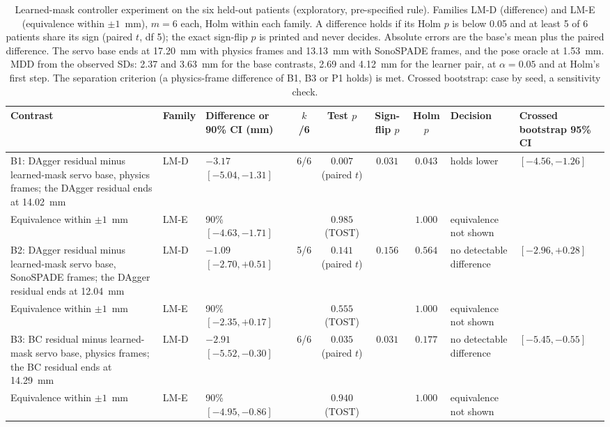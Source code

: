 
\begin{table}[tp]
\renewcommand{\baselinestretch}{1}\scriptsize
\caption{Learned-mask controller experiment on the six held-out patients (exploratory, pre-specified rule). Families LM-D (difference) and LM-E (equivalence within $\pm 1$~mm), $m = 6$ each, Holm within each family. A difference holds if its Holm $p$ is below 0.05 and at least 5 of 6 patients share its sign (paired $t$, df 5); the exact sign-flip $p$ is printed and never decides. Absolute errors are the base's mean plus the paired difference. The servo base ends at 17.20~mm with physics frames and 13.13~mm with SonoSPADE frames, and the pose oracle at 1.53~mm. MDD from the observed SDs: 2.37 and 3.63~mm for the base contrasts, 2.69 and 4.12~mm for the learner pair, at $\alpha = 0.05$ and at Holm's first step. The separation criterion (a physics-frame difference of B1, B3 or P1 holds) is met. Crossed bootstrap: case by seed, a sensitivity check.}
\label{tab:arm-a}
\centering
\setlength{\tabcolsep}{3pt}
\begin{tabularx}{\textwidth}{@{}>{\raggedright\arraybackslash}X l l c c c c >{\raggedright\arraybackslash}p{} l@{}}
\toprule
Contrast & Family & Difference or 90\% CI (mm) & $k$/6 & Test $p$ & Sign-flip $p$ & Holm $p$ & Decision & Crossed bootstrap 95\% CI \\
\midrule
\quad B1: DAgger residual minus learned-mask servo base, physics frames; the DAgger residual ends at 14.02~mm & LM-D & $-3.17$ $[-5.04, -1.31]$ & 6/6 & $0.007$ (paired $t$) & $0.031$ & $0.043$ & holds lower & $[-4.56, -1.26]$ \\
\quad\quad Equivalence within $\pm 1$~mm & LM-E & 90\% $[-4.63, -1.71]$ & & $0.985$ (TOST) & & $1.000$ & equivalence not shown & \\
\quad B2: DAgger residual minus learned-mask servo base, SonoSPADE frames; the DAgger residual ends at 12.04~mm & LM-D & $-1.09$ $[-2.70, +0.51]$ & 5/6 & $0.141$ (paired $t$) & $0.156$ & $0.564$ & no detectable difference & $[-2.96, +0.28]$ \\
\quad\quad Equivalence within $\pm 1$~mm & LM-E & 90\% $[-2.35, +0.17]$ & & $0.555$ (TOST) & & $1.000$ & equivalence not shown & \\
\quad B3: BC residual minus learned-mask servo base, physics frames; the BC residual ends at 14.29~mm & LM-D & $-2.91$ $[-5.52, -0.30]$ & 6/6 & $0.035$ (paired $t$) & $0.031$ & $0.177$ & no detectable difference & $[-5.45, -0.55]$ \\
\quad\quad Equivalence within $\pm 1$~mm & LM-E & 90\% $[-4.95, -0.86]$ & & $0.940$ (TOST) & & $1.000$ & equivalence not shown & \\

\end{tabularx}
\end{table}
